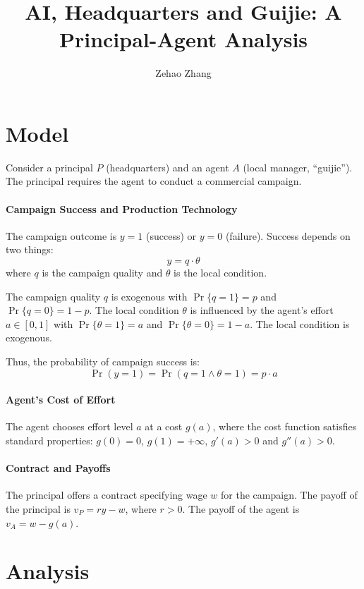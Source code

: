 \documentclass[11pt]{article}
\title{AI, Headquarters and Guijie: A Principal-Agent Analysis}
\author{Zehao Zhang}
\begin{document}
\maketitle

\section{Model}
\label{sec:model}

Consider a principal $P$ (headquarters) and an agent $A$ (local manager, ``guijie''). The principal requires the agent to conduct a commercial campaign.

\paragraph{Campaign Success and Production Technology}

The campaign outcome is $y = 1$ (success) or $y = 0$ (failure). Success depends on two things:
\[
y = q \cdot \theta
\]
where $q$ is the campaign quality and $\theta$ is the local condition.

The campaign quality $q$ is exogenous with $\Pr\{q = 1\} = p$ and $\Pr\{q = 0\} = 1 - p$. The local condition $\theta$ is influenced by the agent's effort $a \in [0, 1]$ with $\Pr\{\theta = 1\} = a$ and $\Pr\{\theta = 0\} = 1 - a$. The local condition is exogenous.

Thus, the probability of campaign success is:
\[
\Pr(y = 1) = \Pr(q = 1 \wedge \theta = 1) = p \cdot a
\]

\paragraph{Agent's Cost of Effort}

The agent chooses effort level $a$ at a cost $g(a)$, where the cost function satisfies standard properties: $g(0) = 0$, $g(1) = +\infty$, $g'(a) > 0$ and $g''(a) > 0$.

\paragraph{Contract and Payoffs}

The principal offers a contract specifying wage $w$ for the campaign. The payoff of the principal is $v_P = r y - w$, where $r>0$. The payoff of the agent is $v_A = w - g(a)$.

\section{Analysis}
\label{sec:analysis}
\end{document}
